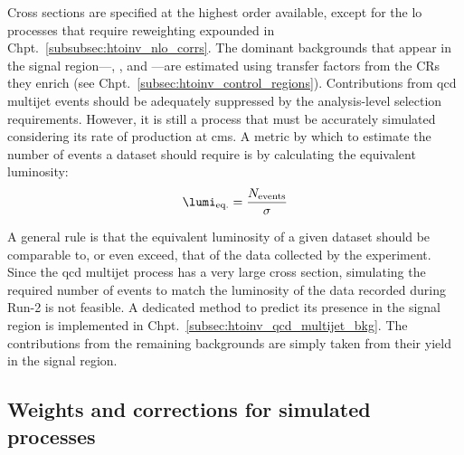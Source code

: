 \medskip
\noindent{}Cross sections are specified at the highest order available, except for the \acrshort{lo} processes that require reweighting expounded in Chpt.~\ref{subsubsec:htoinv_nlo_corrs}. The dominant backgrounds that appear in the signal region---\ttbarpjets, \wtolnupjets, and \ztonunupjets---are estimated using transfer factors from the \glspl{CR} they enrich (see Chpt.~\ref{subsec:htoinv_control_regions}). Contributions from \acrshort{qcd} multijet events should be adequately suppressed by the analysis-level selection requirements. However, it is still a process that must be accurately simulated considering its rate of production at \acrshort{cms}. A metric by which to estimate the number of events a dataset should require is by calculating the equivalent luminosity:
\begin{equation}
    \lumi_{\mathrm{eq.}} = \frac{N_{\mathrm{events}}}{\sigma}
    \label{eq:equivalent_lumi}
\end{equation}

A general rule is that the equivalent luminosity of a given dataset should be comparable to, or even exceed, that of the data collected by the experiment. Since the \acrshort{qcd} multijet process has a very large cross section, simulating the required number of events to match the luminosity of the data recorded during Run-2 is not feasible. A dedicated method to predict its presence in the signal region is implemented in Chpt.~\ref{subsec:htoinv_qcd_multijet_bkg}. The contributions from the remaining backgrounds are simply taken from their yield in the signal region.




\subsection{Weights and corrections for simulated processes}
\label{subsec:htoinv_mc_corrections}


